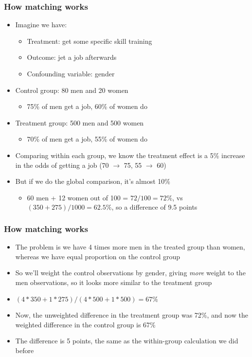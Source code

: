 \documentclass[aspectratio=43]{beamer}
\begin{document}
\begin{frame}
\frametitle{How matching works}
\centering

\begin{itemize}
  \item Imagine we have:
  \begin{itemize}
    \item Treatment: get some specific skill training
    \item Outcome: jet a job afterwards
    \item Confounding variable: gender
  \end{itemize}
  \item Control group: 80 men and 20 women
  \begin{itemize}
    \item 75\% of men get a job, 60\% of women do
  \end{itemize}
  \item Treatment group: 500 men and 500 women
  \begin{itemize}
    \item 70\% of men get a job, 55\% of women do
  \end{itemize}
  \item Comparing within each group, we know the treatment effect is a 5\% increase in the odds of getting a job (70 $\rightarrow$ 75, 55 $\rightarrow$ 60)
  \item But if we do the global comparison, it's almost 10\%
    \begin{itemize}
      \item 60 men + 12 women out of 100 = $72/100 = 72\%$, vs $(350+275)/1000 = 62.5\%$, so a difference of 9.5 points
    \end{itemize}
  \end{itemize}

\end{frame}

\begin{frame}
\frametitle{How matching works}
\centering

\begin{itemize}
  \item The problem is we have 4 times more men in the treated group than women, whereas we have equal proportion on the control group
  \item So we'll weight the control observations by gender, giving \textit{more} weight to the men observations, so it looks more similar to the treatment group
  \item $(4 * 350 + 1 * 275) / (4 * 500 + 1 * 500) = 67\%$
  \item Now, the unweighted difference in the treatment group was 72\%, and now the weighted difference in the control group is 67\%
  \item The difference is 5 points, the same as the within-group calculation we did before
\end{itemize}

\end{frame}
\end{document}
